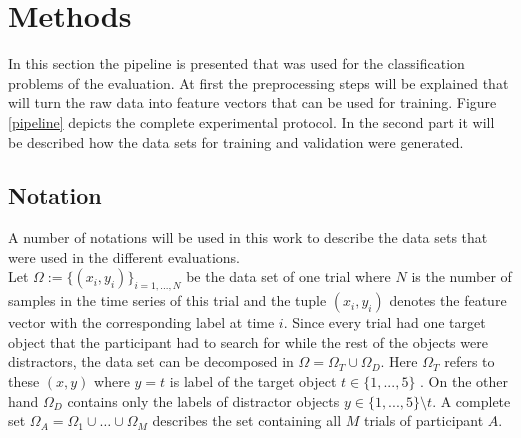 \section{Methods}
In this section the pipeline is presented that was used for the classification problems of the evaluation. At first the preprocessing steps will be explained that will turn the raw data into feature vectors that can be used for training. Figure \ref{pipeline} depicts the complete experimental protocol. In the second part it will be described how the data sets for training and validation were generated.

\subsection{Notation}
A number of notations will be used in this work to describe the data sets that were used in the different evaluations. \\
Let $ \Omega := \{(x_{i},y_{i})\}_{i=1,...,N} $ be the data set of one trial where $ N $ is the number of samples in the time series of this trial and the tuple $ (x_{i},y_{i}) $ denotes the feature vector with the corresponding label at time $ i $. Since every trial had one target object that the participant had to search for while the rest of the objects were distractors, the data set can be decomposed in $ \Omega = \Omega_{T} \cup \Omega_{D} $. Here $ \Omega_{T} $ refers to these $ (x,y) $ where $ y=t $ is label of the target object $ t \in \{1,...,5\} $ . On the other hand $ \Omega_{D} $ contains only the labels of distractor objects $ y \in \{1,...,5\}\setminus t $. A complete set $ \Omega_{A} = \Omega_{1} \cup \hdots \cup \Omega_{M} $ describes the set containing all $ M $ trials of participant $ A $.


